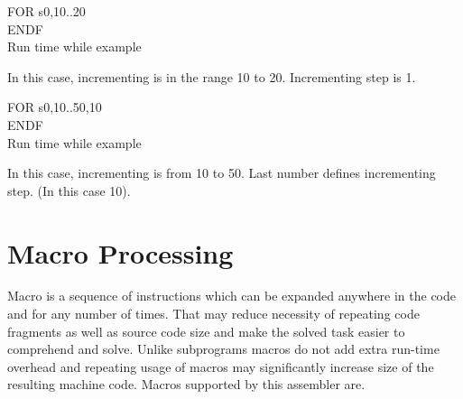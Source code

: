 {\begin{code}[h!]
                                    { \color{highlight_directive} FOR  }
                                    { \color{highlight_constant}   s0,10..20 }\\
                                    { \color{highlight_directive}  ENDF}\\
                                \caption{Run time while example}
                            \end{code}
                    In this case, incrementing is in the range 10 to 20. Incrementing step is 1.
                            \begin{code}[h!]
                                    { \color{highlight_directive} FOR  }
                                    { \color{highlight_constant}   s0,10..50,10 }\\
                                    { \color{highlight_directive}  ENDF}\\
                                \caption{Run time while example}
                            \end{code}
                    In this case, incrementing is from 10 to 50. Last number defines incrementing step. (In this case 10).

        \section{Macro Processing}
                Macro is a sequence of instructions which can be expanded anywhere in the code and for any number of times. That may reduce necessity of
                repeating code fragments as well as source code size and make the solved task easier to comprehend and solve. Unlike subprograms macros do
                not add extra run-time overhead and repeating usage of macros may significantly increase size of the resulting machine code. Macros supported
                by this assembler are.

}
